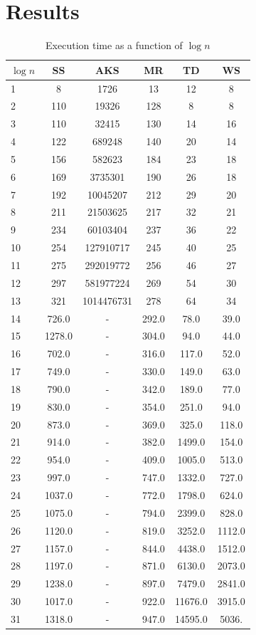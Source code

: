 \section{Results}

\begin{table}
    \centering
    \caption{Execution time as a function of $\log n$}
    \begin{tabular}{|l|c|c|c|c|c|} \hline
        $\log n$ & SS & AKS & MR & TD & WS \\
        \hline
1 & 8 & 1726 & 13 & 12 & 8 \\
2 & 110 & 19326 & 128 & 8 & 8 \\
3 & 110 & 32415 & 130 & 14 & 16 \\
4 & 122 & 689248 & 140 & 20 & 14 \\
5 & 156 & 582623 & 184 & 23 & 18 \\
6 & 169 & 3735301 & 190 & 26 & 18 \\
7 & 192 & 10045207 & 212 & 29 & 20 \\
8 & 211 & 21503625 & 217 & 32 & 21 \\
9 & 234 & 60103404 & 237 & 36 & 22 \\
10& 254 & 127910717 & 245 & 40 & 25 \\
11& 275 & 292019772 & 256 & 46 & 27 \\
12& 297 & 581977224 & 269 & 54 & 30 \\
13& 321 & 1014476731 & 278 & 64 & 34 \\
14& 726.0 & - & 292.0 & 78.0 & 39.0 \\
15& 1278.0 & - & 304.0 & 94.0 & 44.0 \\
16& 702.0 & - & 316.0 & 117.0 & 52.0 \\
17& 749.0 & - & 330.0 & 149.0 & 63.0 \\
18& 790.0 & - & 342.0 & 189.0 & 77.0 \\
19& 830.0 & - & 354.0 & 251.0 & 94.0 \\
20& 873.0 & - & 369.0 & 325.0 & 118.0 \\
21& 914.0 & - & 382.0 & 1499.0 & 154.0 \\
22& 954.0 & - & 409.0 & 1005.0 & 513.0 \\
23& 997.0 & - & 747.0 & 1332.0 & 727.0 \\
24& 1037.0 & - & 772.0 & 1798.0 & 624.0 \\
25& 1075.0 & - & 794.0 & 2399.0 & 828.0 \\
26& 1120.0 & - & 819.0 & 3252.0 & 1112.0 \\
27& 1157.0 & - & 844.0 & 4438.0 & 1512.0 \\
28& 1197.0 & - & 871.0 & 6130.0 & 2073.0 \\
29& 1238.0 & - & 897.0 & 7479.0 & 2841.0 \\
30& 1017.0 & - & 922.0 & 11676.0 & 3915.0 \\
31& 1318.0 & - & 947.0 & 14595.0 & 5036. \\
        \hline
    \end{tabular}
\end{table}


